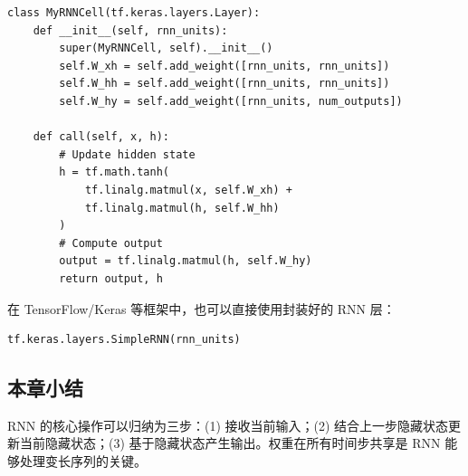 \begin{lstlisting}[caption={基于 TensorFlow 的 RNN 层实现}]
class MyRNNCell(tf.keras.layers.Layer):
    def __init__(self, rnn_units):
        super(MyRNNCell, self).__init__()
        self.W_xh = self.add_weight([rnn_units, rnn_units])
        self.W_hh = self.add_weight([rnn_units, rnn_units])
        self.W_hy = self.add_weight([rnn_units, num_outputs])

    def call(self, x, h):
        # Update hidden state
        h = tf.math.tanh(
            tf.linalg.matmul(x, self.W_xh) +
            tf.linalg.matmul(h, self.W_hh)
        )
        # Compute output
        output = tf.linalg.matmul(h, self.W_hy)
        return output, h
\end{lstlisting}

在 TensorFlow/Keras 等框架中，也可以直接使用封装好的 RNN 层：

\begin{lstlisting}[caption={使用 Keras 封装的 SimpleRNN 层}]
tf.keras.layers.SimpleRNN(rnn_units)
\end{lstlisting}

\subsection{本章小结}

RNN 的核心操作可以归纳为三步：(1) 接收当前输入；(2) 结合上一步隐藏状态更新当前隐藏状态；(3) 基于隐藏状态产生输出。权重在所有时间步共享是 RNN 能够处理变长序列的关键。

\newpage
